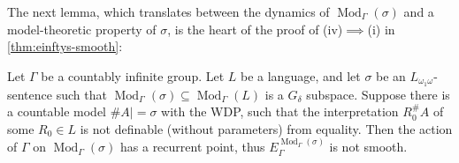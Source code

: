 \documentclass[11pt]{article}
\DeclareMathOperator\Mod{Mod}
\begin{document}
The next lemma, which translates between the dynamics of $\Mod_\Gamma(\sigma)$ and a model-theoretic property of $\sigma$, is the heart of the proof of (iv)$\implies$(i) in \cref{thm:einftys-smooth}:

\begin{lemma}
\label{lm:modgamma-recurrent}
Let $\Gamma$ be a countably infinite group.  Let $L$ be a language, and let $\sigma$ be an $L_{\omega_1\omega}$-sentence such that $\Mod_\Gamma(\sigma) \subseteq \Mod_\Gamma(L)$ is a $G_\delta$ subspace.  Suppose there is a countable model $\#A |= \sigma$ with the WDP, such that the interpretation $R_0^\#A$ of some $R_0 \in L$ is not definable (without parameters) from equality.  Then the action of $\Gamma$ on $\Mod_\Gamma(\sigma)$ has a recurrent point, thus $E_\Gamma^{\Mod_\Gamma(\sigma)}$ is not smooth.
\end{lemma}
\end{document}
